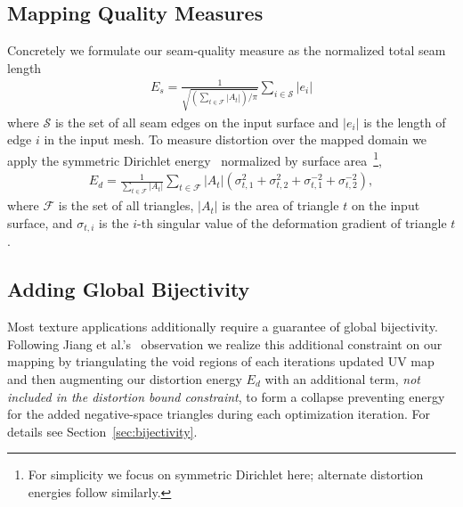 \subsection{Mapping Quality Measures}
Concretely we formulate our seam-quality measure as the normalized total seam length
\begin{align}
E_s 
= \frac{1}{\sqrt{(\sum_{t\in\mathcal{F}} |A_t|)/\pi}} \sum_{i \in \mathcal{S}} |e_i|
\end{align}
where $\mathcal{S}$ is the set of all seam edges on the input surface and $|e_i|$ is the length of edge $i$ in the input mesh.
To measure distortion over the mapped domain we apply the symmetric Dirichlet energy~\cite{Smith2015Bijective} normalized by surface area~\footnote{For simplicity we focus on symmetric Dirichlet here; alternate distortion energies follow similarly.}, 
\begin{align} 
E_d 
= \frac{1}{\sum_{t\in\mathcal{F}} |A_t|} \sum_{t\in\mathcal{F}} |A_t|(\sigma_{t,1}^2 + \sigma_{t,2}^2 + \sigma_{t,1}^{-2} + \sigma_{t,2}^{-2}),
\end{align}
where $\mathcal{F}$ is the set of all triangles, $|A_t|$ is the area of triangle $t$ on the input surface, and $\sigma_{t,i}$ is the $i$-th singular value of the deformation gradient of triangle $t$.
%


\subsection{Adding Global Bijectivity}
Most texture applications additionally require a guarantee of global bijectivity. Following Jiang et al.'s\  observation we realize this additional constraint on our mapping by triangulating the void regions of each iterations updated UV map and then augmenting our distortion energy $E_d$ with an additional term, \emph{not included in the distortion bound constraint}, to form a collapse preventing energy for the added negative-space triangles during each optimization iteration. For details see Section\ \ref{sec:bijectivity}. 


